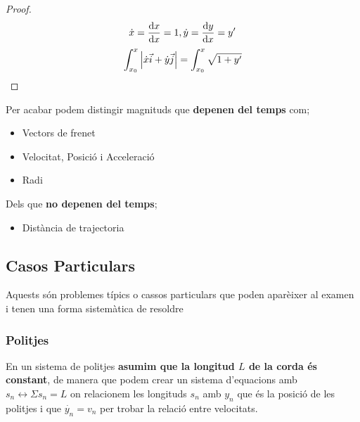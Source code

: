 \documentclass[12pt]{article}
\begin{document}
\begin{proof}
    \[\dot{x} = \dv{x}{x} = 1, \dot{y} = \dv{y}{x} = y'\]
    \[\int_{x_0}^{x} \abs{\dot{x}\vec{i} + \dot{y}\vec{j}} = \int_{x_0}^{x} \sqrt{1+y'}\]
\end{proof}

Per acabar podem distingir magnituds que \textbf{depenen del temps} com;

\begin{itemize}
    \item Vectors de frenet
    \item Velocitat, Posició i Acceleració
    \item Radi
\end{itemize}

Dels que \textbf{no depenen del temps};

\begin{itemize}
    \item Distància de trajectoria
\end{itemize}

\subsection{Casos Particulars}

Aquests són problemes típics o cassos particulars que poden aparèixer al examen i tenen una forma sistemàtica de resoldre

\subsubsection{Politjes}

En un sistema de politjes \textbf{asumim que la longitud $L$ de la corda és constant}, de manera que podem crear un sistema d'equacions amb $s_n \leftrightarrow \Sigma s_n = L$ on relacionem les longituds $s_n$ amb $y_n$ que és la posició de les politjes i que $\dot{y_n} = v_n$ per trobar la relació entre velocitats.

\begin{center}
\end{center}
\end{document}
